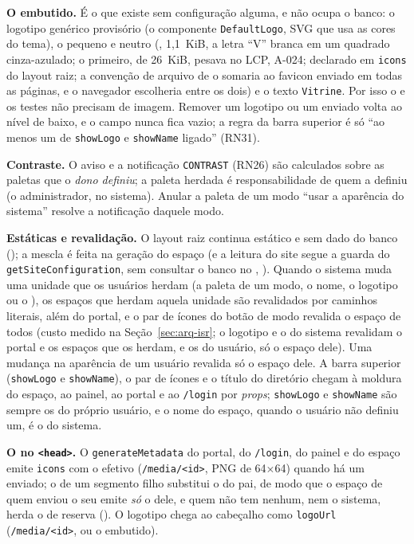 \textbf{O embutido.} É o que existe sem configuração alguma, e não ocupa o banco: o logotipo genérico provisório (o componente \texttt{DefaultLogo}, SVG  que usa as cores do tema), o  pequeno e neutro (, 1,1~KiB, a letra ``V'' branca em um quadrado cinza-azulado; o primeiro, de 26~KiB, pesava no LCP, A-024; declarado em \texttt{icons} do layout raiz; a convenção de arquivo de  o somaria ao favicon enviado em todas as páginas, e o navegador escolheria entre os dois) e o texto \texttt{Vitrine}. Por isso o  e os testes não precisam de imagem. Remover um logotipo ou um  enviado volta ao nível de baixo, e o campo nunca fica vazio; a regra da barra superior é só ``ao menos um de \texttt{showLogo} e \texttt{showName} ligado'' (RN31).

\textbf{Contraste.} O aviso e a notificação \texttt{CONTRAST} (RN26) são calculados sobre as paletas que o \emph{dono definiu}; a paleta herdada é responsabilidade de quem a definiu (o administrador, no sistema). Anular a paleta de um modo ``usar a aparência do sistema'' resolve a notificação daquele modo.

\textbf{Estáticas e revalidação.} O layout raiz continua estático e sem dado do banco (); a mescla é feita na geração do espaço (e a leitura do site segue a guarda do \texttt{getSiteConfiguration}, sem consultar o banco no , ). Quando o sistema muda uma unidade que os usuários herdam (a paleta de um modo, o nome, o logotipo ou o ), os espaços que herdam aquela unidade são revalidados por caminhos literais, além do portal, e o par de ícones do botão de modo revalida o espaço de todos (custo medido na Seção~\ref{sec:arq-isr}; o logotipo e o  do sistema revalidam o portal e os espaços que os herdam, e os do usuário, só o espaço dele). Uma mudança na aparência de um usuário revalida só o espaço dele. A barra superior (\texttt{showLogo} e \texttt{showName}), o par de ícones e o título do diretório chegam à moldura do espaço, ao painel, ao portal e ao \texttt{/login} por \emph{props}; \texttt{showLogo} e \texttt{showName} são sempre os do próprio usuário, e o nome do espaço, quando o usuário não definiu um, é o do sistema.

\textbf{O  no \texttt{<head>}.} O \texttt{generateMetadata} do portal, do \texttt{/login}, do painel e do espaço emite \texttt{icons} com o  efetivo (\texttt{/media/<id>}, PNG de 64$\times$64) quando há um enviado; o de um segmento filho substitui o do pai, de modo que o espaço de quem enviou o seu emite \emph{só} o dele, e quem não tem nenhum, nem o sistema, herda o de reserva (). O logotipo chega ao cabeçalho como \texttt{logoUrl} (\texttt{/media/<id>}, ou o embutido).

